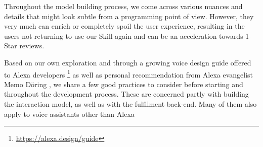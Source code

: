 Throughout the model building process, we come across various nuances and details that might look subtle from a programming point of view. However, they very much can enrich or completely spoil the user experience, resulting in the users not returning to use our Skill again and can be an acceleration towards 1-Star reviews.

Based on our own exploration and through a growing voice design guide offered to Alexa developers \footnote{\url{https://alexa.design/guide}} as well as personal recommendation from Alexa evangelist Memo Döring \cite{memo:devDay}, we share a few good practices to consider before starting and throughout the development process. These are concerned partly with building the interaction model, as well as with the fulfilment back-end. Many of them also apply to voice assistants other than Alexa

